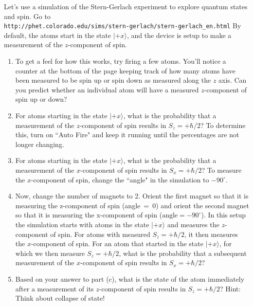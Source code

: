 \newpage 

\begin{problem}
Let's use a simulation of the Stern-Gerlach experiment to explore 
quantum states and spin.  Go to \\ 
\verb+http://phet.colorado.edu/sims/stern-gerlach/stern-gerlach_en.html+ 
By default, the atoms start in the state $\vert\mbox{$+x$}\rangle$, and the device is setup to make a measurement of the $z$-component of spin. 
\begin{enumerate}

\item To get a feel for how this works, try firing a few atoms.
You'll notice a counter at the bottom of the page keeping track of how
many atoms have been measured to be spin up or spin down as measured
along the $z$ axis.  Can you predict whether an individual atom will
have a measured $z$-component of spin up or down?
\item For atoms starting in the state $\vert\mbox{$+x$}\rangle$, what is
the probability that a measurement of the $z$-component of spin results
in $S_z = +\hbar/2$?  To determine this, turn on ``Auto Fire" and keep
it running until the percentages are not longer changing.
\item For atoms starting in the state $\vert\mbox{$+x$}\rangle$, what is
the probability that a measurement of the $x$-component of spin results
in $S_x = +\hbar/2$?  To measure the $x$-component of spin, change the
``angle" in the simulation to $-90^\circ$.
\item Now, change the number of magnets to 2.  Orient the first magnet
so that it is measuring the z-component of spin (angle~=~0) and orient
the second magnet so that it is measuring the x-component of spin
($\mbox{angle} = -90^\circ$).  In this setup the simulation starts
with atoms in the state $\vert\mbox{$+x$}\rangle$ and measures the
$z$-component of spin.  For atoms with measured $S_z = +\hbar/2$,
it then measures the $x$-component of spin.  For an atom that started
in the state $\vert\mbox{$+x$}\rangle$, for which we then measure 
$S_z = +\hbar/2$, what is the probability that a subsequent measurement of
the $x$-component of spin results in $S_x = +\hbar/2$?
\item Based on your answer to part (c), what is the state of the atom
immediately after a measurement of its $z$-component of spin results in
$S_z = +\hbar/2$?  Hint:  Think about collapse of state!
\end{enumerate}
\label{prob:sterngerlach}
\end{problem}

